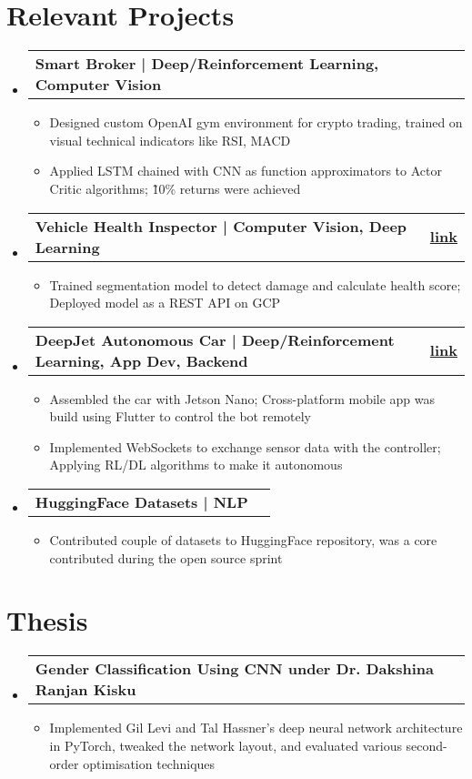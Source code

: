 \documentclass[letterpaper,10pt]{article}
\makeatletter
\newcommand{\resumeItemClean}[1]{
    \item\small{
        {#1 \vspace{-2pt}}
    }
}
\newcommand{\projectheading}[3]{
    \vspace{-1pt}\item
        \begin{tabular*}{0.97\textwidth}{l@{\extracolsep{\fill}}r}
            \textbf{#1} & \textbf{#2} #3\\
    \end{tabular*}\vspace{-5pt}
}
\newcommand{\resumeSubHeadingListStart}{\begin{itemize}[leftmargin=*]}
\newcommand{\resumeSubHeadingListEnd}{\end{itemize}}
\newcommand{\resumeItemListStart}{\begin{itemize}}
\newcommand{\resumeItemListEnd}{\end{itemize}\vspace{-5pt}}
\makeatother
\begin{document}
\section{Relevant Projects}
    \resumeSubHeadingListStart
        \projectheading{Smart Broker | Deep/Reinforcement Learning, Computer Vision}{}{}
            \resumeItemListStart
                \resumeItemClean
                    {Designed custom OpenAI gym environment for crypto trading, trained on visual technical indicators like RSI, MACD}
                \resumeItemClean
                    {Applied LSTM chained with CNN as function approximators to Actor Critic algorithms; \~10\% returns were achieved}
            \resumeItemListEnd
        \projectheading{Vehicle Health Inspector | Computer Vision, Deep Learning}{\href{https://finddentsonmycar.tech/}{link}}{}
            \resumeItemListStart
                \resumeItemClean
                    {Trained segmentation model to detect damage and calculate health score; Deployed model as a REST API on GCP}
            \resumeItemListEnd
        \projectheading{DeepJet Autonomous Car | Deep/Reinforcement Learning, App Dev, Backend}{\href{https://github.com/vinaykudari/eureka-bot}{link}}{}
            \resumeItemListStart
                \resumeItemClean
                    {Assembled the car with Jetson Nano; Cross-platform mobile app was build using Flutter to control the bot remotely}
                \resumeItemClean
                    {Implemented WebSockets to exchange sensor data with the controller; Applying RL/DL algorithms to make it autonomous}
            \resumeItemListEnd
        \projectheading{HuggingFace Datasets | NLP }{\href{}{}}{}
            \resumeItemListStart
                \resumeItemClean
                    {Contributed couple of datasets to HuggingFace repository, was a core contributed during the open source sprint}
            \resumeItemListEnd
    \resumeSubHeadingListEnd
    
\section{Thesis}
\resumeSubHeadingListStart
\projectheading{Gender Classification Using CNN under Dr. Dakshina Ranjan Kisku}{}{}{}
            \resumeItemListStart
                \resumeItemClean
                    {Implemented Gil Levi and Tal Hassner's deep neural network architecture in PyTorch, tweaked the network layout, and evaluated various second-order optimisation techniques}
            \resumeItemListEnd
  \resumeSubHeadingListEnd
    
\end{document}

